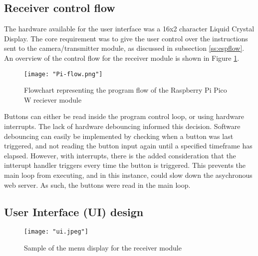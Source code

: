 \documentclass[class=report,11pt,crop=false]{standalone}
\begin{document}
\subsection{Receiver control flow}

The hardware available for the user interface was a 16x2 character Liquid Crystal Display. The core requirement was to give the user control over the instructions sent to the camera/transmitter module, as discussed in subsection \ref{ss:espflow}. An overview of the control flow for the receiver module is shown in Figure \ref{fig:piflow}.

\begin{figure}[ht]
    \centering
    \texttt{[image: "Pi-flow.png"]}
    \caption{Flowchart representing the program flow of the Raspberry Pi Pico W reciever module}
    \label{fig:piflow}
\end{figure}

Buttons can either be read inside the program control loop, or using hardware interrupts. The lack of hardware debouncing informed this decision. Software debouncing can easily be implemented by checking when a button was last triggered, and not reading the button input again until a specified timeframe has elapsed. However, with interrupts, there is the added consideration that the intterupt handler triggers every time the button is triggered. This prevents the main loop from executing, and in this instance, could slow down the asychronous web server. As such, the buttons were read in the main loop. 

\subsection{User Interface (UI) design}
\begin{figure}[ht]
    \centering
    \texttt{[image: "ui.jpeg"]}
    \caption{Sample of the menu display for the receiver module}
    \label{fig:uisample}
\end{figure}
\end{document}
